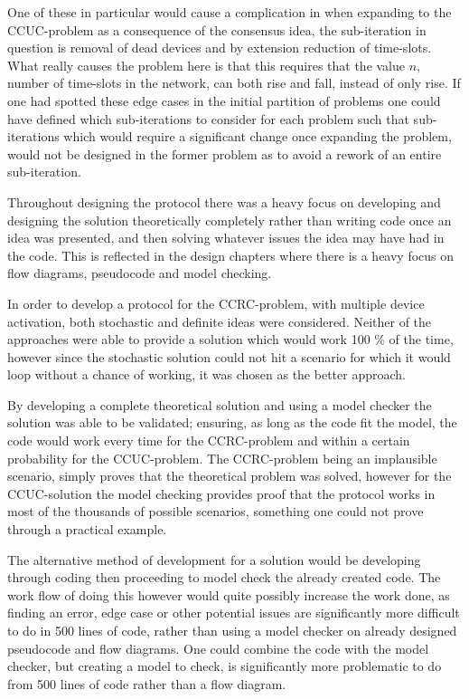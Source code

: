 One of these in particular would cause a complication in when expanding to the CCUC-problem as a consequence of the consensus idea, the sub-iteration in question is removal of dead devices and by extension reduction of time-slots.
What really causes the problem here is that this requires that the value $n$, number of time-slots in the network, can both rise and fall, instead of only rise.
If one had spotted these edge cases in the initial partition of problems one could have defined which sub-iterations to consider for each problem such that sub-iterations which would require a significant change once expanding the problem, would not be designed in the former problem as to avoid a rework of an entire sub-iteration.

\bigskip \noindent
Throughout designing the protocol there was a heavy focus on developing and designing the solution theoretically completely rather than writing code once an idea was presented, and then solving whatever issues the idea may have had in the code.
This is reflected in the design chapters where there is a heavy focus on flow diagrams, pseudocode and model checking.

In order to develop a protocol for the CCRC-problem, with multiple device activation, both stochastic and definite ideas were considered.
Neither of the approaches were able to provide a solution which would work 100 \% of the time, however since the stochastic solution could not hit a scenario for which it would loop without a chance of working, it was chosen as the better approach.

By developing a complete theoretical solution and using a model checker the solution was able to be validated; ensuring, as long as the code fit the model, the code would work every time for the CCRC-problem and within a certain probability for the CCUC-problem.
The CCRC-problem being an implausible scenario, simply proves that the theoretical problem was solved, however for the CCUC-solution the model checking provides proof that the protocol works in most of the thousands of possible scenarios, something one could not prove through a practical example.

The alternative method of development for a solution would be developing through coding then proceeding to model check the already created code.
The work flow of doing this however would quite possibly increase the work done, as finding an error, edge case or other potential issues are significantly more difficult to do in 500 lines of code, rather than using a model checker on already designed pseudocode and flow diagrams.
One could combine the code with the model checker, but creating a model to check, is significantly more problematic to do from 500 lines of code rather than a flow diagram.

